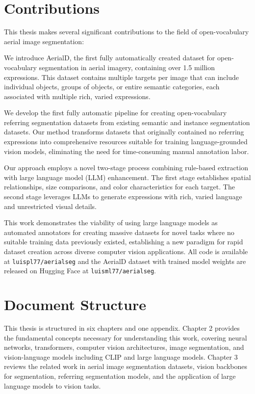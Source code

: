\section{Contributions}

This thesis makes several significant contributions to the field of open-vocabulary aerial image segmentation:

We introduce AerialD, the first fully automatically created dataset for open-vocabulary segmentation in aerial imagery, containing over 1.5 million expressions. This dataset contains multiple targets per image that can include individual objects, groups of objects, or entire semantic categories, each associated with multiple rich, varied expressions.

We develop the first fully automatic pipeline for creating open-vocabulary referring segmentation datasets from existing semantic and instance segmentation datasets. Our method transforms datasets that originally contained no referring expressions into comprehensive resources suitable for training language-grounded vision models, eliminating the need for time-consuming manual annotation labor.

Our approach employs a novel two-stage process combining rule-based extraction with large language model (LLM) enhancement. The first stage establishes spatial relationships, size comparisons, and color characteristics for each target. The second stage leverages LLMs to generate expressions with rich, varied language and unrestricted visual details.

This work demonstrates the viability of using large language models as automated annotators for creating massive datasets for novel tasks where no suitable training data previously existed, establishing a new paradigm for rapid dataset creation across diverse computer vision applications. All code is available at \texttt{luispl77/aerialseg} and the AerialD dataset with trained model weights are released on Hugging Face at \texttt{luisml77/aerialseg}.
\section{Document Structure}

This thesis is structured in six chapters and one appendix. Chapter 2 provides the fundamental concepts necessary for understanding this work, covering neural networks, transformers, computer vision architectures, image segmentation, and vision-language models including CLIP and large language models. Chapter 3 reviews the related work in aerial image segmentation datasets, vision backbones for segmentation, referring segmentation models, and the application of large language models to vision tasks. 

